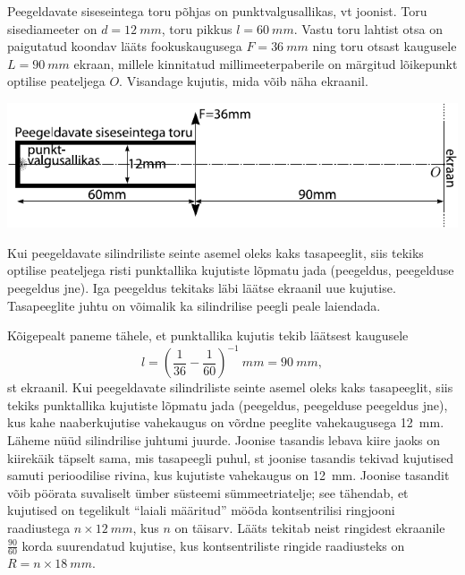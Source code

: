 
Peegeldavate siseseintega toru põhjas on punktvalgusallikas, vt joonist. Toru
sisediameeter on
$d=\SI{12}{mm}$, toru pikkus $l=\SI{60}{mm}$. Vastu toru lahtist otsa on
paigutatud koondav lääts fookuskaugusega $F=\SI{36}{mm}$ ning toru otsast
kaugusele $L=\SI{90}{mm}$ ekraan, millele kinnitatud millimeeterpaberile
on märgitud lõikepunkt optilise peateljega $O$.
Visandage kujutis, mida võib näha ekraanil.

\begin{center}
\includegraphics[width=\textwidth]{2012-v3g-06-toru-valgusallikas-lxxts}
\end{center}

\hint
Kui peegeldavate silindriliste seinte asemel oleks kaks tasapeeglit, siis
tekiks optilise peateljega risti punktallika kujutiste lõpmatu jada (peegeldus, peegelduse peegeldus jne). Iga peegeldus tekitaks läbi läätse ekraanil uue kujutise. Tasapeeglite juhtu on võimalik ka silindrilise peegli peale laiendada.

\solu
Kõigepealt paneme tähele, et punktallika kujutis tekib läätsest kaugusele
$$l=\left(\frac 1{36}-\frac 1{60}\right)^{-1}\SI{}{mm}=\SI{90}{mm},$$
st ekraanil. Kui peegeldavate silindriliste seinte asemel oleks kaks tasapeeglit, siis
tekiks punktallika kujutiste lõpmatu jada (peegeldus, peegelduse peegeldus jne), kus 
kahe naaberkujutise vahekaugus on võrdne peeglite vahekaugusega \SI{12}{mm}. 
Läheme nüüd silindrilise juhtumi juurde. Joonise tasandis lebava kiire jaoks on 
kiirekäik täpselt sama, mis tasapeegli puhul, st joonise tasandis tekivad kujutised samuti 
perioodilise rivina, kus kujutiste vahekaugus on \SI{12}{mm}. Joonise tasandit võib pöörata suvaliselt
ümber süsteemi sümmeetriatelje; see tähendab, et kujutised on tegelikult \enquote{laiali määritud} mööda kontsentrilisi
ringjooni raadiustega $n\times\SI{12}{mm}$, kus $n$ on täisarv. Lääts tekitab neist ringidest 
ekraanile $\frac{90}{60}$ korda suurendatud kujutise, 
kus kontsentriliste ringide raadiusteks on $R=n\times \SI{18}{mm}$.

